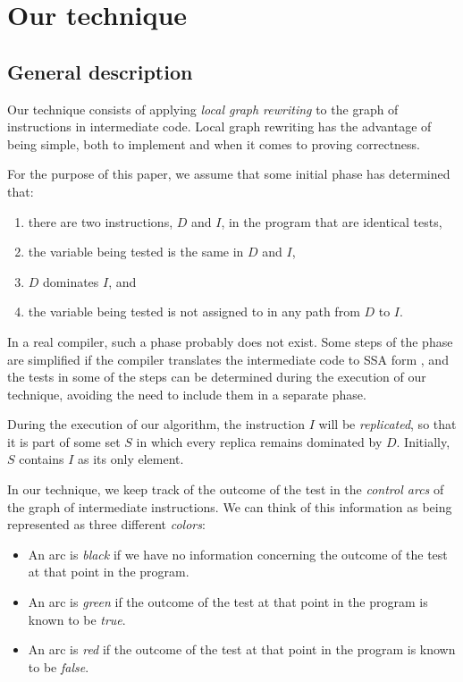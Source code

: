 \section{Our technique}

\subsection{General description}

Our technique consists of applying \emph{local graph rewriting} to the
graph of instructions in intermediate code.  Local graph rewriting has
the advantage of being simple, both to implement and when it comes to
proving correctness.

For the purpose of this paper, we assume that some initial phase has
determined that:

\begin{enumerate}
\item there are two instructions, $D$ and $I$, in the program that
  are identical tests,
\item the variable being tested is the same in $D$ and $I$,
\item $D$ dominates $I$, and
\item the variable being tested is not assigned to in any path from
  $D$ to $I$.
\end{enumerate}

In a real compiler, such a phase probably does not exist.  Some steps
of the phase are simplified if the compiler translates the
intermediate code to SSA form \cite{Cytron:1989:EMC:75277.75280,
  Cytron:1991:ECS:115372.115320}, and the tests in some of the steps
can be determined during the execution of our technique, avoiding the
need to include them in a separate phase.

During the execution of our algorithm, the instruction $I$ will be
\emph{replicated}, so that it is part of some set $S$ in which every
replica remains dominated by $D$.  Initially, $S$ contains $I$ as its
only element.

In our technique, we keep track of the outcome of the test in the
\emph{control arcs} of the graph of intermediate instructions.
We can think of this information as being represented as three
different \emph{colors}:

\begin{itemize}
\item An arc is \emph{black} if we have no information concerning the
  outcome of the test at that point in the program.
\item An arc is \emph{green} if the outcome of the test at that point in
  the program is known to be \emph{true}.
\item An arc is \emph{red} if the outcome of the test at that point in
  the program is known to be \emph{false}.
\end{itemize}

